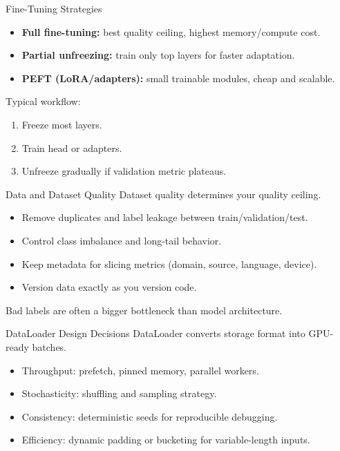 \documentclass[aspectratio=169]{beamer}
\begin{document}
\begin{frame}[t]{Fine-Tuning Strategies}
\begin{itemize}
    \item \textbf{Full fine-tuning:} best quality ceiling, highest memory/compute cost.
    \item \textbf{Partial unfreezing:} train only top layers for faster adaptation.
    \item \textbf{PEFT (LoRA/adapters):} small trainable modules, cheap and scalable.
\end{itemize}
\vspace{1mm}
Typical workflow:
\begin{enumerate}
    \item Freeze most layers.
    \item Train head or adapters.
    \item Unfreeze gradually if validation metric plateaus.
\end{enumerate}
\end{frame}

\begin{frame}[t]{Data and Dataset Quality}
Dataset quality determines your quality ceiling.
\vspace{1mm}
\begin{itemize}
    \item Remove duplicates and label leakage between train/validation/test.
    \item Control class imbalance and long-tail behavior.
    \item Keep metadata for slicing metrics (domain, source, language, device).
    \item Version data exactly as you version code.
\end{itemize}
\vspace{1mm}
Bad labels are often a bigger bottleneck than model architecture.
\end{frame}

\begin{frame}[t]{DataLoader Design Decisions}
DataLoader converts storage format into GPU-ready batches.
\vspace{1mm}
\begin{itemize}
    \item Throughput: prefetch, pinned memory, parallel workers.
    \item Stochasticity: shuffling and sampling strategy.
    \item Consistency: deterministic seeds for reproducible debugging.
    \item Efficiency: dynamic padding or bucketing for variable-length inputs.
\end{itemize}
\end{frame}
\end{document}
